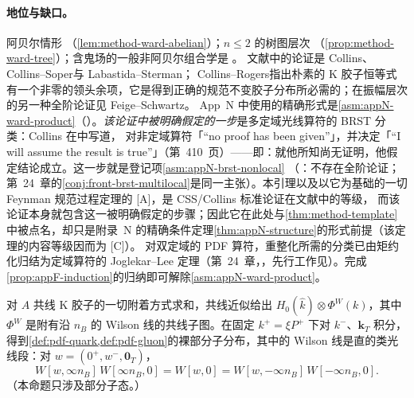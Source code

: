 \paragraph{地位与缺口。}阿贝尔情形 \tagR（\cref{lem:method-ward-abelian}）；$n\le2$ 的树图层次 \tagR（\cref{prop:method-ward-tree}）；含鬼场的一般非阿贝尔组合学是 \tagA。
文献中的论证是 Collins\cite[第~11.9~节，第~416~页，图~11.6]{Collins2011}、Collins--Soper\cite{CollinsSoper1982a}与 Labastida--Sterman\cite{Labastida:1984gy}；
Collins--Rogers\cite{Collins:2008sg}指出朴素的 K 胶子恒等式有一个非零的领头余项，它是得到正确的规范不变胶子分布所必需的；在振幅层次的另一种全阶论证见 Feige--Schwartz\cite{FeigeSchwartz2014}。
App~N 中使用的精确形式是\cref{asm:appN-ward-product}（\tagA）。\emph{该论证中被明确假定的一步}是多定域光线算符的 BRST 分类：Collins 在\cite[第~11.3.2~节，第~407--410~页]{Collins2011}中写道，
对非定域算符「“no proof has been given”」，并决定「“I will assume the result is true”」（第~410~页）——即：就他所知尚无证明，他假定结论成立。这一步就是登记项\cref{asm:appN-brst-nonlocal}
（\tagC：不存在全阶论证；第~24~章的\cref{conj:front-brst-multilocal}是同一主张）。本引理以及以它为基础的一切 Feynman 规范过程定理的 [A]，是 CSS/Collins 标准论证在文献中的等级，
而该论证本身就包含这一被明确假定的步骤；因此它在此处与\cref{thm:method-template}中被点名，却只是附录~N 的精确条件定理\cref{thm:appN-structure}的形式前提（该定理的内容等级因而为 [C]）。
对双定域的 PDF 算符，重整化所需的分类已由矩约化归结为定域算符的 Joglekar--Lee 定理（第~24~章，\tagA，先行工作见\cite{Braun:2019qtp}）。完成\cref{prop:appF-induction}的归纳即可解除\cref{asm:appN-ward-product}。

\begin{proposition}\label{prop:method-collinear-wilson}
对 $A$ 共线 K 胶子的一切附着方式求和，共线近似给出 $H_0(\hat k)\otimes\Phi^W(k)$，其中 $\Phi^W$ 是附有沿 $n_B$ 的 Wilson 线的共线子图。在固定 $k^+=\xi P^+$ 下对 $k^-$、$\mathbf k_T$ 积分，
得到\cref{def:pdf-quark,def:pdf-gluon}的裸部分子分布，其中的 Wilson 线是直的类光线段：对 $w=(0^+,w^-,\mathbf 0_T)$，
\begin{equation}\label{eq:method-straight}
W[w,\infty n_B]\,W[\infty n_B,0]=W[w,0]=W[w,-\infty n_B]\,W[-\infty n_B,0] .
\end{equation}
（本命题只涉及部分子态。）
\end{proposition}

